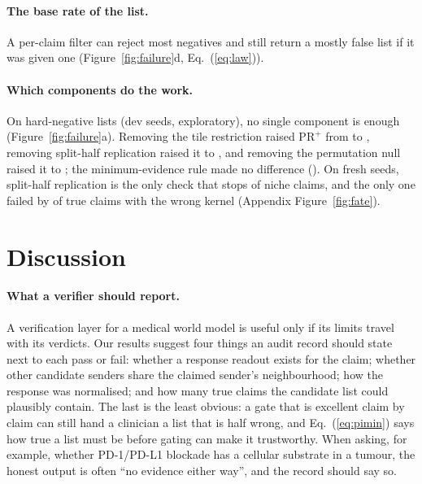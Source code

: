 \documentclass[letterpaper]{article} %
\begin{document}
\paragraph{The base rate of the list.} A per-claim filter can reject most negatives and still return a mostly false
list if it was given one (Figure~\ref{fig:failure}d, Eq.~(\ref{eq:law})).

\paragraph{Which components do the work.} On hard-negative lists (dev seeds, exploratory), no single component is
enough (Figure~\ref{fig:failure}a). Removing the tile restriction raised $\mathrm{PR}^{+}$ from \ablAfiveFull{} to
\ablAfiveNoTiles{}, removing split-half replication raised it to \ablAfiveNoSplit{}, and removing the permutation null
raised it to \ablAfiveNoPerm{}; the minimum-evidence rule made no difference (\ablAfiveNoMinEvidence{}). On fresh
seeds, split-half replication is the only check that stops \fateNicheOnlyHalves{} of niche claims, and the only one
failed by \fateTrueAoneathreeOnlyHalves{} of true claims with the wrong kernel (Appendix Figure~\ref{fig:fate}).

\section{Discussion}
\paragraph{What a verifier should report.} A verification layer for a medical world model is useful only if its limits
travel with its verdicts. Our results suggest four things an audit record should state next to each pass or fail:
whether a response readout exists for the claim; whether other candidate senders share the claimed sender's
neighbourhood; how the response was normalised; and how many true claims the candidate list could plausibly contain.
The last is the least obvious: a gate that is excellent claim by claim can still hand a clinician a list that is half
wrong, and Eq.~(\ref{eq:pimin}) says how true a list must be before gating can make it trustworthy. When asking, for
example, whether PD-1/PD-L1 blockade has a cellular substrate in a tumour, the honest output is often ``no evidence
either way'', and the record should say so.
\end{document}
